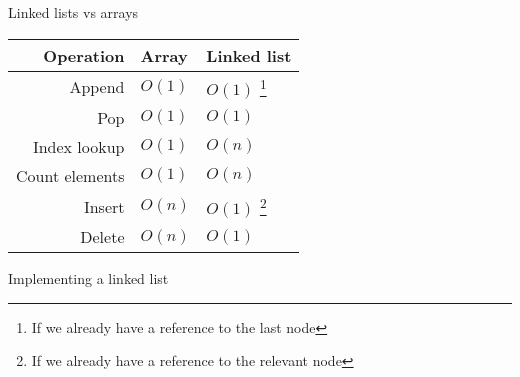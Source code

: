 \begin{frame}{Linked lists vs arrays}
	\begin{center}
		\begin{tabular}{|r|l|l|}
			\hline
			\textbf{Operation} & \textbf{Array} & \textbf{Linked list} \\\hline
			\pause Append & $O(1)$ & $O(1)$ \footnote{\label{f:llend}If we already have a reference to the last node} \\
			\pause Pop & $O(1)$ & $O(1)$ \footnoteref{f:llend} \\
			\pause Index lookup & $O(1)$ & $O(n)$ \\
			\pause Count elements & $O(1)$ & $O(n)$ \\
			\pause Insert & $O(n)$ & $O(1)$ \footnote{\label{f:llinsert}If we already have a reference to the relevant node} \\
			\pause Delete & $O(n)$ & $O(1)$ \footnoteref{f:llinsert} \\
			\hline
		\end{tabular}
	\end{center}
\end{frame}

\begin{frame}{Implementing a linked list}
\end{frame}
